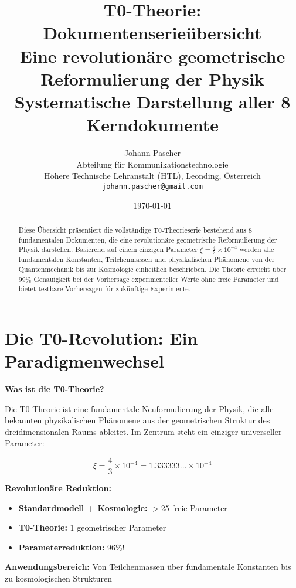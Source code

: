 \documentclass[12pt,a4paper]{article}
\title{\textbf{T0-Theorie: Dokumentenserieübersicht}\\[0.5cm]
	\large Eine revolutionäre geometrische Reformulierung der Physik\\[0.3cm]
	\normalsize Systematische Darstellung aller 8 Kerndokumente}
\author{Johann Pascher\\
	Abteilung für Kommunikationstechnologie\\
	Höhere Technische Lehranstalt (HTL), Leonding, Österreich\\
	\texttt{johann.pascher@gmail.com}}
\date{\today}
\newcommand{\xipar}{\xi}
\begin{document}
	
	\maketitle
	
	\begin{abstract}
		Diese Übersicht präsentiert die vollständige T0-Theorieserie bestehend aus 8 fundamentalen Dokumenten, die eine revolutionäre geometrische Reformulierung der Physik darstellen. Basierend auf einem einzigen Parameter $\xipar = \frac{4}{3} \times 10^{-4}$ werden alle fundamentalen Konstanten, Teilchenmassen und physikalischen Phänomene von der Quantenmechanik bis zur Kosmologie einheitlich beschrieben. Die Theorie erreicht über 99\% Genauigkeit bei der Vorhersage experimenteller Werte ohne freie Parameter und bietet testbare Vorhersagen für zukünftige Experimente.
	\end{abstract}
	
	\tableofcontents
	\newpage
	
	\section{Die T0-Revolution: Ein Paradigmenwechsel}
	
	\begin{overview}
		\textbf{Was ist die T0-Theorie?}
		
		Die T0-Theorie ist eine fundamentale Neuformulierung der Physik, die alle bekannten physikalischen Phänomene aus der geometrischen Struktur des dreidimensionalen Raums ableitet. Im Zentrum steht ein einziger universeller Parameter:
		
		\begin{equation}
			\boxed{\xipar = \frac{4}{3} \times 10^{-4} = 1.333333... \times 10^{-4}}
		\end{equation}
		
		\textbf{Revolutionäre Reduktion:}
		\begin{itemize}
			\item \textbf{Standardmodell + Kosmologie:} $>$25 freie Parameter
			\item \textbf{T0-Theorie:} 1 geometrischer Parameter
			\item \textbf{Parameterreduktion:} 96\%!
		\end{itemize}
		
		\textbf{Anwendungsbereich:} Von Teilchenmassen über fundamentale Konstanten bis zu kosmologischen Strukturen
	\end{overview}
	
\end{document}
